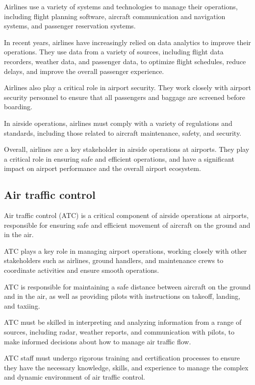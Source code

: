     Airlines use a variety of systems and technologies to manage their operations, including flight planning software, aircraft communication and navigation systems, and passenger reservation systems.

    In recent years, airlines have increasingly relied on data analytics to improve their operations. They use data from a variety of sources, including flight data recorders, weather data, and passenger data, to optimize flight schedules, reduce delays, and improve the overall passenger experience.

    Airlines also play a critical role in airport security. They work closely with airport security personnel to ensure that all passengers and baggage are screened before boarding.

    In airside operations, airlines must comply with a variety of regulations and standards, including those related to aircraft maintenance, safety, and security.

    Overall, airlines are a key stakeholder in airside operations at airports. They play a critical role in ensuring safe and efficient operations, and have a significant impact on airport performance and the overall airport ecosystem.
    
    \subsection{Air traffic control}

    Air traffic control (ATC) is a critical component of airside operations at airports, responsible for ensuring safe and efficient movement of aircraft on the ground and in the air.
    
    ATC plays a key role in managing airport operations, working closely with other stakeholders such as airlines, ground handlers, and maintenance crews to coordinate activities and ensure smooth operations.
    
    ATC is responsible for maintaining a safe distance between aircraft on the ground and in the air, as well as providing pilots with instructions on takeoff, landing, and taxiing.
    
    ATC must be skilled in interpreting and analyzing information from a range of sources, including radar, weather reports, and communication with pilots, to make informed decisions about how to manage air traffic flow.
    
    ATC staff must undergo rigorous training and certification processes to ensure they have the necessary knowledge, skills, and experience to manage the complex and dynamic environment of air traffic control.
    
